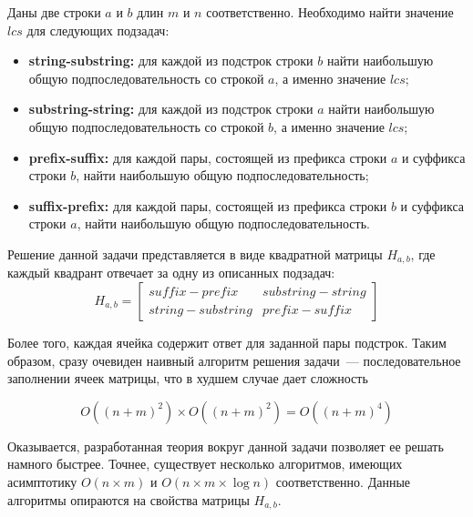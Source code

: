 Даны две строки $a$ и $b$ длин $m$ и $n$ соответственно. 
Необходимо найти значение $lcs$ для следующих подзадач:
\begin{itemize}
    \item \textbf{string-substring:} для каждой из подстрок строки $b$ найти наибольшую общую подпоследовательность со строкой $a$, а именно значение $lcs$;
    \item \textbf{substring-string:} для каждой из подстрок строки $a$ найти наибольшую общую подпоследовательность со строкой $b$, а именно значение $lcs$;
    \item \textbf{prefix-suffix:} для каждой пары, состоящей из префикса строки $a$ и суффикса строки $b$, найти наибольшую общую подпоследовательность;
    \item \textbf{suffix-prefix:} для каждой пары, состоящей из префикса строки $b$ и суффикса строки $a$, найти наибольшую общую подпоследовательность.
\end{itemize}

Решение данной задачи представляется в виде квадратной матрицы $H_{a,b}$, где каждый квадрант отвечает за одну из описанных подзадач: 
\begin{equation}
 H_{a,b} = \begin{bmatrix}
suffix-prefix & substring-string \\
string-substring & prefix-suffix 
\end{bmatrix}    
\end{equation}

Более того, каждая ячейка содержит ответ для заданной пары подстрок.
Таким образом, сразу очевиден наивный алгоритм решения  задачи~--- последовательное  заполнении ячеек матрицы, что в худшем случае дает сложность

\[
O((n+m)^2) \times O((n+m)^2) = O((n+ m)^4)
\]

Оказывается, разработанная теория вокруг  данной задачи позволяет ее решать намного быстрее.
Точнее, существует несколько алгоритмов, имеющих асимптотику $O(n \times m)$ и $O(n \times m \times \log n)$ соответственно.
Данные алгоритмы опираются на свойства матрицы $H_{a,b}$.




